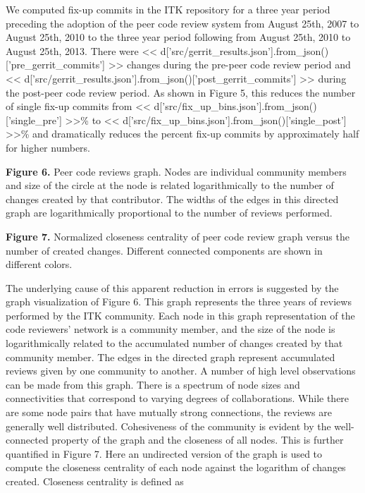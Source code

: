 \documentclass{frontiersENG} %
\begin{document}
We computed fix-up commits in the ITK repository for a three year period
preceding the adoption of the peer code review system from August 25th, 2007
to August 25th, 2010 to the three year period following from August 25th, 2010
to August 25th, 2013.  There were
<< d['src/gerrit_results.json'].from_json()['pre_gerrit_commits'] >>
changes during the pre-peer code review period and
<< d['src/gerrit_results.json'].from_json()['post_gerrit_commits'] >>
during the post-peer code review period.  As shown in
Figure 5, this reduces the number of
single fix-up commits from <<
d['src/fix_up_bins.json'].from_json()['single_pre'] >>\%
to << d['src/fix_up_bins.json'].from_json()['single_post'] >>\% and
dramatically reduces the percent fix-up commits by approximately half for
higher numbers.

\textbf{Figure 6. } {Peer code reviews graph.  Nodes are individual community
members and size of the circle at the node is related logarithmically to the
number of changes created by that contributor. The widths of the edges in
this directed graph are logarithmically proportional to the number of reviews
performed.} \label{fig:06}

\textbf{Figure 7. }{Normalized closeness centrality of peer code review graph
versus the number of created changes.  Different connected components are shown
in different colors.}\label{fig:07}

The underlying cause of this apparent reduction in errors is suggested by the
graph visualization of Figure 6. This graph represents the three years of
reviews performed by the ITK community. Each node in this graph representation
of the code reviewers' network is a community member, and the size of the node is
logarithmically related to the accumulated number of changes created by that
community member.  The edges in the directed graph represent accumulated
reviews given by one community to another. A number of high level observations
can be made from this graph.  There is a spectrum of node sizes and
connectivities that correspond to varying degrees of collaborations. While there
are some node pairs that have mutually strong connections, the reviews are
generally well distributed.  Cohesiveness of the community is evident by the
well-connected property of the graph and the closeness of all nodes.  This is
further quantified in Figure 7.  Here an undirected version of the graph is
used to compute the closeness centrality of each node against the logarithm of
changes created.  Closeness centrality is defined as \cite{Freeman1979}
\end{document}
